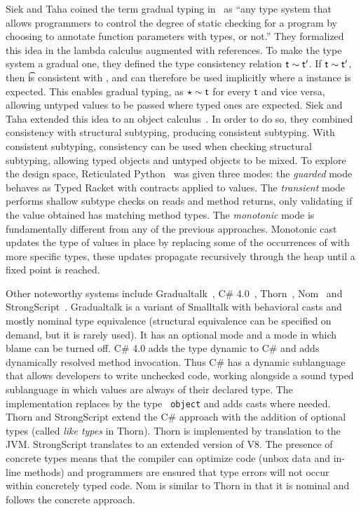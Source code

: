 \documentclass[USenglish]{tex/lipics-v2016}
\begin{document}
Siek and Taha coined the term gradual typing in~\cite{SiekTaha06} as ``any
type system that allows programmers to control the degree of static checking
for a program by choosing to annotate function parameters with types, or
not.'' They formalized this idea in the lambda calculus augmented with
references. To make the type system a gradual one, they defined the type
consistency relation $\t \sim \tp$. If $\t \sim \tp$, then \t is consistent
with \tp, and can therefore be used implicitly where a \tp instance is
expected.  This enables gradual typing, as $\any \sim \t$ for every $\t$ and
vice versa, allowing untyped values to be passed where typed ones are
expected.  Siek and Taha extended this idea to an object
calculus~\cite{SiekTaha07}.  
In order to do so, they combined consistency with structural
subtyping, producing consistent subtyping. With consistent subtyping,
consistency can be used when checking structural subtyping, allowing typed
objects and untyped objects to be mixed.  To explore the design space,
Reticulated Python~\cite{siek14} was given three modes: the \emph{guarded}
mode behaves as Typed Racket with contracts applied to values.  The
\emph{transient} mode performs shallow subtype checks on reads and method
returns, only validating if the value obtained has matching method types.
The \emph{monotonic} mode is fundamentally different from any of the
previous approaches. Monotonic cast updates the type of values in place by
replacing some of the occurrences of \any with more specific types, these
updates propagate recursively through the heap until a fixed point is
reached.

Other noteworthy systems include Gradualtalk~\cite{GS13}, C\#
4.0~\cite{Bierman10}, Thorn~\cite{oopsla09}, Nom~\cite{Muehlboeck2017} and
Strong\-Script~\cite{ecoop15}. Gradualtalk is a variant of Smalltalk with
behavioral casts and mostly nominal type equivalence (structural equivalence
can be specified on demand, but it is rarely used).  It has an optional mode
and a mode in which blame can be turned off.  C\# 4.0 adds the type {\sf
  dynamic} to C\# and adds dynamically resolved method invocation. Thus C\#
has a dynamic sublanguage that allows developers to write unchecked code,
working alongside a sound typed sublanguage in which values are always of
their declared type.  The implementation replaces \any by the type {\tt
  object} and adds casts where needed.  Thorn and StrongScript extend the
C\# approach with the addition of optional types (called {\em like types} in
Thorn).  Thorn is implemented by translation to the JVM. StrongScript
translates to an extended version of V8. The presence of concrete types means
that the compiler can optimize code (unbox data and in-line methods) and
programmers are ensured that type errors will not occur within concretely
typed code. Nom is similar to Thorn in that it is nominal and follows the
concrete approach.
\end{document}
